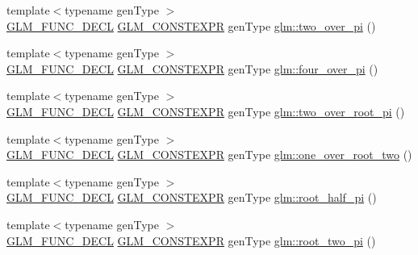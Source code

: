 \begin{DoxyCompactItemize}
\item 
{\footnotesize template$<$typename gen\+Type $>$ }\\\mbox{\hyperlink{setup_8hpp_ab2d052de21a70539923e9bcbf6e83a51}{G\+L\+M\+\_\+\+F\+U\+N\+C\+\_\+\+D\+E\+CL}} \mbox{\hyperlink{setup_8hpp_a08b807947b47031d3a511f03f89645ad}{G\+L\+M\+\_\+\+C\+O\+N\+S\+T\+E\+X\+PR}} gen\+Type \mbox{\hyperlink{group__gtc__constants_ga74eadc8a211253079683219a3ea0462a}{glm\+::two\+\_\+over\+\_\+pi}} ()
\item 
{\footnotesize template$<$typename gen\+Type $>$ }\\\mbox{\hyperlink{setup_8hpp_ab2d052de21a70539923e9bcbf6e83a51}{G\+L\+M\+\_\+\+F\+U\+N\+C\+\_\+\+D\+E\+CL}} \mbox{\hyperlink{setup_8hpp_a08b807947b47031d3a511f03f89645ad}{G\+L\+M\+\_\+\+C\+O\+N\+S\+T\+E\+X\+PR}} gen\+Type \mbox{\hyperlink{group__gtc__constants_ga753950e5140e4ea6a88e4a18ba61dc09}{glm\+::four\+\_\+over\+\_\+pi}} ()
\item 
{\footnotesize template$<$typename gen\+Type $>$ }\\\mbox{\hyperlink{setup_8hpp_ab2d052de21a70539923e9bcbf6e83a51}{G\+L\+M\+\_\+\+F\+U\+N\+C\+\_\+\+D\+E\+CL}} \mbox{\hyperlink{setup_8hpp_a08b807947b47031d3a511f03f89645ad}{G\+L\+M\+\_\+\+C\+O\+N\+S\+T\+E\+X\+PR}} gen\+Type \mbox{\hyperlink{group__gtc__constants_ga5827301817640843cf02026a8d493894}{glm\+::two\+\_\+over\+\_\+root\+\_\+pi}} ()
\item 
{\footnotesize template$<$typename gen\+Type $>$ }\\\mbox{\hyperlink{setup_8hpp_ab2d052de21a70539923e9bcbf6e83a51}{G\+L\+M\+\_\+\+F\+U\+N\+C\+\_\+\+D\+E\+CL}} \mbox{\hyperlink{setup_8hpp_a08b807947b47031d3a511f03f89645ad}{G\+L\+M\+\_\+\+C\+O\+N\+S\+T\+E\+X\+PR}} gen\+Type \mbox{\hyperlink{group__gtc__constants_ga788fa23a0939bac4d1d0205fb4f35818}{glm\+::one\+\_\+over\+\_\+root\+\_\+two}} ()
\item 
{\footnotesize template$<$typename gen\+Type $>$ }\\\mbox{\hyperlink{setup_8hpp_ab2d052de21a70539923e9bcbf6e83a51}{G\+L\+M\+\_\+\+F\+U\+N\+C\+\_\+\+D\+E\+CL}} \mbox{\hyperlink{setup_8hpp_a08b807947b47031d3a511f03f89645ad}{G\+L\+M\+\_\+\+C\+O\+N\+S\+T\+E\+X\+PR}} gen\+Type \mbox{\hyperlink{group__gtc__constants_ga4e276cb823cc5e612d4f89ed99c75039}{glm\+::root\+\_\+half\+\_\+pi}} ()
\item 
{\footnotesize template$<$typename gen\+Type $>$ }\\\mbox{\hyperlink{setup_8hpp_ab2d052de21a70539923e9bcbf6e83a51}{G\+L\+M\+\_\+\+F\+U\+N\+C\+\_\+\+D\+E\+CL}} \mbox{\hyperlink{setup_8hpp_a08b807947b47031d3a511f03f89645ad}{G\+L\+M\+\_\+\+C\+O\+N\+S\+T\+E\+X\+PR}} gen\+Type \mbox{\hyperlink{group__gtc__constants_ga2bcedc575039fe0cd765742f8bbb0bd3}{glm\+::root\+\_\+two\+\_\+pi}} ()

\end{DoxyCompactItemize}
